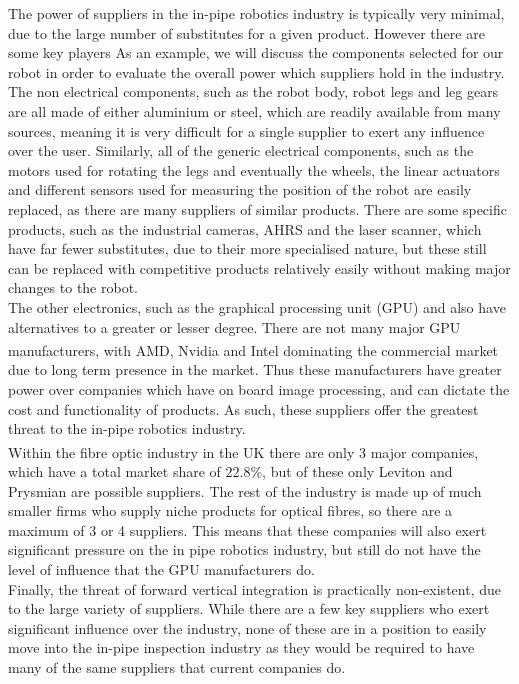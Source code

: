 \documentclass[11pt]{article}		%
\begin{document}
			The power of suppliers in the in-pipe robotics industry is typically very minimal, due to the large number of substitutes for a given product.
			However there are some key players
			As an example, we will discuss the components selected for our robot in order to evaluate the overall power which suppliers hold in the industry.
			\\
			The non electrical components, such as the robot body, robot legs and leg gears are all made of either aluminium or steel, which are readily available from many sources, meaning it is very difficult for a single supplier to exert any influence over the user.
			Similarly, all of the generic electrical components, such as the motors used for rotating the legs and eventually the wheels, the linear actuators and different sensors used for measuring the position of the robot are easily replaced, as there are many suppliers of similar products.
			There are some specific products, such as the industrial cameras, AHRS and the laser scanner, which have far fewer substitutes, due to their more specialised nature, but these still can be replaced with competitive products relatively easily without making major changes to the robot.
			\\
			The other electronics, such as the graphical processing unit (GPU) and  also have alternatives to a greater or lesser degree.
			There are not many major GPU manufacturers, with AMD, Nvidia and Intel dominating the commercial market \textsuperscript{\cite{rake2020graphic}} due to long term presence in the market.
			Thus these manufacturers have greater power over companies which have on board image processing, and can dictate the cost and functionality of  products.
			As such, these suppliers offer the greatest threat to the in-pipe robotics industry.
			\\
			Within the fibre optic industry in the UK there are only 3 major companies\textsuperscript{\cite{neve2020fibreoptic}}, which have a total market share of $22.8$\%, but of these only Leviton and Prysmian are possible suppliers.
			The rest of the industry is made up of much smaller firms who supply niche products for optical fibres, so there are a maximum of 3 or 4 suppliers.
			This means that these companies will also exert significant pressure on the in pipe robotics industry, but still do not have the level of influence that the GPU manufacturers do.
			\\
			Finally, the threat of forward vertical integration is practically non-existent, due to the large variety of suppliers.
			While there are a few key suppliers who exert significant influence over the industry, none of these are in a position to easily move into the in-pipe inspection industry as they would be required to have many of the same suppliers that current companies do.
			
\end{document}
